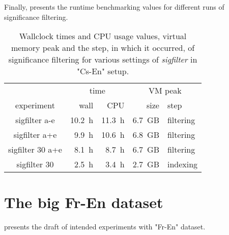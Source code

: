 Finally,  presents the runtime benchmarking
values for different runs of significance filtering.

\begin{table}[ht]
\centering
\begin{tabular}{ | c | r r | r l | }
\hline
 & \multicolumn{2}{|c|}{time} & \multicolumn{2}{|c|}{VM peak} \\
experiment & wall & CPU & size & step \\
\hline
\hline
sigfilter a-e     & 10.2~h & 11.3~h & 6.7~GB & filtering \\
sigfilter a+e     & 9.9~h & 10.6~h & 6.8~GB & filtering \\
sigfilter 30 a+e  & 8.1~h & 8.7~h & 6.7~GB & filtering \\
sigfilter 30      & 2.5~h & 3.4~h & 2.7~GB & indexing \\
\hline
\end{tabular}
\caption{\label{cs-en-wmt13-sigfilter-runtime-benchmarks}
Wallclock times and CPU usage values, virtual memory peak and the step, in which
it occurred, of significance filtering for various settings of \emph{sigfilter} in "Cs-En" setup.}
\end{table}

\section{The big Fr-En dataset}
\label{sec:fr-en-results}

 presents the draft of intended experiments with "Fr-En" dataset.

